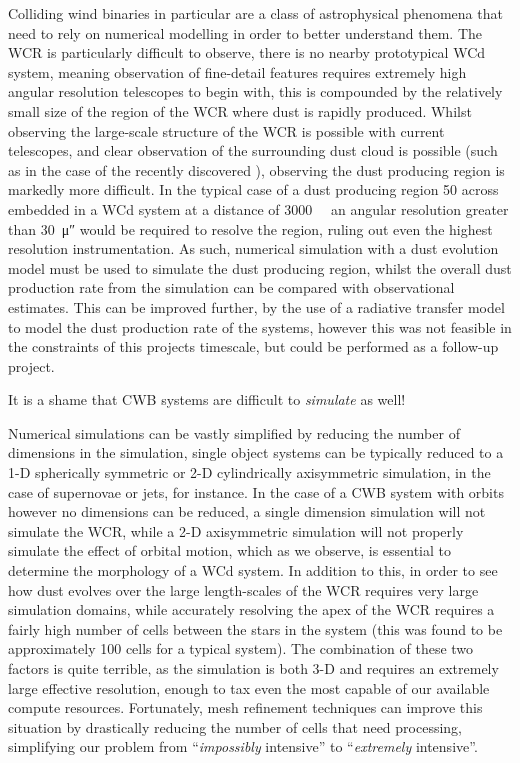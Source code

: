 
Colliding wind binaries in particular are a class of astrophysical phenomena that need to rely on numerical modelling in order to better understand them.
The WCR is particularly difficult to observe, there is no nearby prototypical WCd system, meaning observation of fine-detail features requires extremely high angular resolution telescopes to begin with, this is compounded by the relatively small size of the region of the WCR where dust is rapidly produced.
Whilst observing the large-scale structure of the WCR is possible with current telescopes, and clear observation of the surrounding dust cloud is possible (such as in the case of the recently discovered \textcite{callinghamAnisotropicWindsWolf2019}), observing the dust producing region is markedly more difficult.
In the typical case of a dust producing region \SI{50}{\au} across embedded in a WCd system at a distance of \SI{3000}{\kilo\parsec} an angular resolution greater than \SI{30}{\micro\arcsecond} would be required to resolve the region, ruling out even the highest resolution instrumentation.
As such, numerical simulation with a dust evolution model must be used to simulate the dust producing region, whilst the overall dust production rate from the simulation can be compared with observational estimates.
This can be improved further, by the use of a radiative transfer model to model the dust production rate of the systems, however this was not feasible in the constraints of this projects timescale, but could be performed as a follow-up project.


It is a shame that CWB systems are difficult to \textit{simulate} as well!

Numerical simulations can be vastly simplified by reducing the number of dimensions in the simulation, single object systems can be typically reduced to a 1-D spherically symmetric or 2-D cylindrically axisymmetric simulation, in the case of supernovae or jets, for instance.
In the case of a CWB system with orbits however no dimensions can be reduced, a single dimension simulation will not simulate the WCR, while a 2-D axisymmetric simulation will not properly simulate the effect of orbital motion, which as we observe, is essential to determine the morphology of a WCd system.
In addition to this, in order to see how dust evolves over the large length-scales of the WCR requires very large simulation domains, while accurately resolving the apex of the WCR requires a fairly high number of cells between the stars in the system (this was found to be approximately 100 cells for a typical system).
The combination of these two factors is quite terrible, as the simulation is both 3-D and requires an extremely large effective resolution, enough to tax even the most capable of our available compute resources.
Fortunately, mesh refinement techniques can improve this situation by drastically reducing the number of cells that need processing, simplifying our problem from ``\textit{impossibly} intensive'' to ``\textit{extremely} intensive''.

